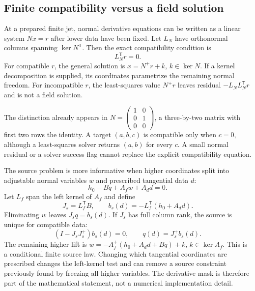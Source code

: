 \documentclass[11pt,a4paper]{article}
\begin{document}
\subsection{Finite compatibility versus a field solution}
At a prepared finite jet, normal derivative equations can be written
as a linear system $Nx=r$ after lower data have been fixed. Let
$L_N$ have orthonormal columns spanning $\ker N^{\mathsf T}$.
Then the exact compatibility condition is
\begin{equation}
 L_N^{\mathsf T}r=0.
\end{equation}
For compatible $r$, the general solution is
$x=N^+r+k$, $k\in\ker N$. If a kernel decomposition is supplied,
its coordinates parametrize the remaining normal freedom. For
incompatible $r$, the least-squares value $N^+r$ leaves residual
$-L_NL_N^{\mathsf T}r$ and is not a field solution.

The distinction already appears in
$N=\begin{pmatrix}1&0\\0&1\\0&0\end{pmatrix}$, a three-by-two
matrix with first two rows the identity. A target $(a,b,c)$ is
compatible only when $c=0$, although a least-squares solver returns
$(a,b)$ for every $c$. A small normal residual or a solver success
flag cannot replace the explicit compatibility equation.

The source problem is more informative when higher coordinates split
into adjustable normal variables $w$ and prescribed tangential data $d$:
\begin{equation}
 h_0+Bq+A_fw+A_dd=0.
\end{equation}
Let $L_f$ span the left kernel of $A_f$ and define
\begin{equation}
 J_s=L_f^{\mathsf T}B,\qquad
 b_s(d)=-L_f^{\mathsf T}(h_0+A_dd).
\end{equation}
Eliminating $w$ leaves $J_sq=b_s(d)$. If $J_s$ has full column
rank, the source is unique for compatible data:
\begin{equation}
 (I-J_sJ_s^+)b_s(d)=0,\qquad q(d)=J_s^+b_s(d).
\end{equation}
The remaining higher lift is
$w=-A_f^+(h_0+A_dd+Bq)+k$, $k\in\ker A_f$.
This is a conditional finite source law. Changing which tangential
coordinates are prescribed changes the left-kernel test and can
remove a source constraint previously found by freezing all higher
variables. The derivative mask is therefore part of the mathematical
statement, not a numerical implementation detail.
\end{document}
